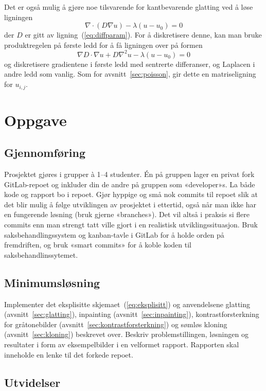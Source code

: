 \documentclass[11pt,a4paper]{article}
\begin{document}
Det er også mulig å gjøre noe tilsvarende for kantbevarende glatting ved å løse ligningen
$$
\nabla\cdot(D\nabla u) - \lambda(u - u_0) = 0
$$
der $D$ er gitt av ligning~(\ref{eq:diffparam}). For å diskretisere denne, kan man bruke produktregelen på første ledd for å få ligningen over på formen
$$
\nabla D \cdot \nabla u + D\nabla^2 u - \lambda(u - u_0) = 0
$$
og diskretisere gradientene i første ledd med sentrerte differanser, og Laplacen i andre ledd som vanlig. Som for avsnitt~\ref{sec:poisson}, gir dette en matriseligning for $u_{i,j}$.

\section{Oppgave}

\subsection{Gjennomføring}

Prosjektet gjøres i grupper à 1–4 studenter. Én på gruppen lager en privat fork GitLab-repoet og inkluder din de andre på gruppen som «developer»s. La både kode og rapport bo i repoet. Gjør hyppige og små nok commits til repoet slik at det blir mulig å følge utviklingen av prosjektet i ettertid, også når man ikke har en fungerende løsning (bruk gjerne «branches»). Det vil altså i praksis si flere commits enn man strengt tatt ville gjort i en realistisk utviklingssituasjon. Bruk saksbehandlingssystem og kanban-tavle i GitLab for å holde orden på fremdriften, og bruk «smart commits» for å koble koden til saksbehandlinssytemet.

\subsection{Minimumsløsning}

Implementer det eksplisitte skjemaet~(\ref{eq:eksplisitt}) og anvendelsene glatting (avsnitt~\ref{sec:glatting}), inpainting (avsnitt~\ref{sec:inpainting}), kontrastforsterkning for gråtonebilder (avsnitt~\ref{sec:kontrastforsterkning}) og sømløs kloning (avsnitt~\ref{sec:kloning}) beskrevet over. Beskriv problemstillingen, løsningen og resultater i form av eksempelbilder i en velformet rapport. Rapporten skal inneholde en lenke til det forkede repoet.

\subsection{Utvidelser}
\end{document}
